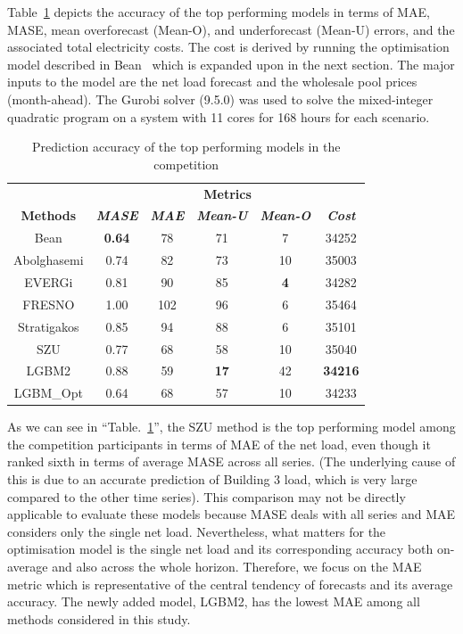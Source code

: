 \documentclass[conference]{IEEEtran}
\begin{document}

Table~\ref{tab:accComp} depicts the accuracy of the top performing models in terms of MAE, MASE, mean overforecast (Mean-O), and underforecast (Mean-U) errors, and the associated total electricity costs. The cost is derived by running the optimisation model described in Bean~\cite{bean2022methodology} which is expanded upon in the next section. The major inputs to the model are the net load forecast and the wholesale pool prices (month-ahead). The Gurobi solver (9.5.0) was used to solve the mixed-integer quadratic program on a system with 11 cores for 168 hours for each scenario.

\begin{table}[htbp]
\caption{Prediction accuracy of the top performing models in the competition}
\begin{center}
\begin{tabular}{|c|c|c|c|c|c|}
\hline
\textbf{}&\multicolumn{5}{|c|}{\textbf{Metrics}} \\
\cline{2-6} 
\textbf{Methods} & \textbf{\textit{MASE}}& \textbf{\textit{MAE}}& \textbf{\textit{Mean-U}}& \textbf{\textit{Mean-O}}& \textbf{\textit{Cost}} \\
\hline
Bean& \textbf{0.64} & 78 & 71& 7 & 34252\\
Abolghasemi &0.74 & 82 & 73& 10& 35003 \\
EVERGi & 0.81 & 90  & 85 & \textbf{4} &	34282\\
FRESNO & 1.00 &102 & 96 & 6 &35464\\
Stratigakos & 0.85 &94 & 88 &6 & 35101 \\
SZU & 0.77 & 68&   {58}& 10 & 35040\\
LGBM2 & 0.88 & 59& \textbf{17}& 42&\textbf{34216}\\
LGBM\_Opt & 0.64 &68 & 57& 10 &34233\\
\hline
\end{tabular}
\label{tab:accComp}
\end{center}
\end{table}

As we can see in ``Table.~\ref{tab:accComp}'', the SZU method is the top performing model among the competition participants in terms of MAE of the net load, even though it ranked sixth in terms of average MASE across all series. (The underlying cause of this is due to an accurate prediction of Building 3 load, which is very large compared to the other time series). This comparison may not be directly applicable to evaluate these models because MASE deals with all series and MAE considers only the single net load. Nevertheless, what matters for the optimisation model is the single net load and its corresponding accuracy both on-average and also across the whole horizon. Therefore, we focus on the MAE metric which is representative of the central tendency of forecasts and its average accuracy. The newly added model, LGBM2, has the lowest MAE among all methods considered in this study. 
\end{document}
